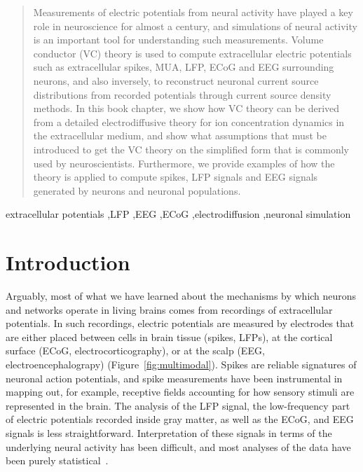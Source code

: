 \documentclass[preprint,11pt,authoryear]{elsarticle}
\begin{document}
\begin{frontmatter}
\begin{abstract}
Measurements of electric potentials from neural activity have played a key role in neuroscience for almost a century, and simulations of neural activity is an important tool for understanding such measurements. Volume conductor (VC) theory is used to compute extracellular electric potentials such as extracellular spikes, MUA, LFP, ECoG and EEG surrounding neurons, and also inversely, to reconstruct neuronal current source distributions from recorded potentials through current source density methods. In this book chapter, we show how VC theory can be derived from a detailed electrodiffusive theory for ion concentration dynamics in the extracellular medium, and show what assumptions that must be introduced to get the VC theory on the simplified form that is commonly used by neuroscientists. Furthermore, we provide examples of how the theory is applied to compute spikes, LFP signals and EEG signals generated by neurons and neuronal populations.
\end{abstract}

\begin{keyword}
extracellular potentials \sep LFP \sep EEG \sep ECoG \sep electrodiffusion \sep neuronal simulation

\end{keyword}

\end{frontmatter}

\tableofcontents

\linenumbers

\section{Introduction}
\label{sec:introduction}

Arguably, most of what we have learned about the mechanisms by which neurons and networks operate in living brains comes from recordings of 
extracellular potentials. In such recordings, electric potentials are measured by electrodes that are either placed between cells in brain tissue (spikes, LFPs), at the cortical surface (ECoG, electrocorticography), or at the scalp (EEG, electroencephalograpy) (Figure~\ref{fig:multimodal}). Spikes are reliable signatures of neuronal action potentials, and spike measurements have been instrumental in mapping out, for example, receptive fields accounting for how sensory stimuli are represented in the brain. The analysis of the LFP signal, the low-frequency part of electric potentials recorded inside gray matter, as well as the ECoG, and EEG signals is less straightforward. Interpretation of these signals in terms of the underlying neural activity has been difficult, and most analyses of the data have been purely statistical~\citep{Nunez2006,Buzsaki2012,Einevoll2013,Ilmoniemi2019}.
\end{document}
